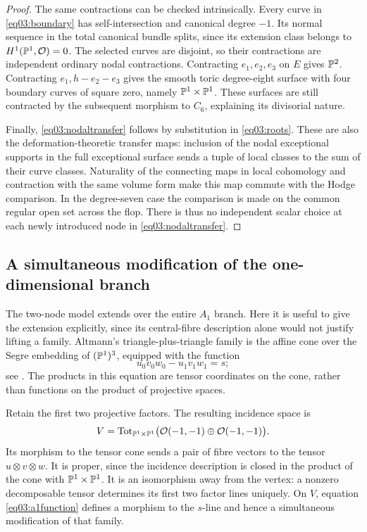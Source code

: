 \begin{proof}
The same contractions can be checked intrinsically.  Every curve
in \eqref{eq03:boundary} has self-intersection and canonical degree
$-1$.  Its normal sequence in the total canonical bundle splits,
since its extension class belongs to $H^1(\mathbb{P}^1,\mathcal{O})=0$.
The selected curves are disjoint, so their contractions are independent
ordinary nodal contractions.  Contracting $e_1,e_2,e_3$ on $E$ gives
$\mathbb{P}^2$.  Contracting $e_1,h-e_2-e_3$ gives the smooth toric
degree-eight surface with four boundary curves of square zero,
namely $\mathbb{P}^1\times\mathbb{P}^1$.  These surfaces are still contracted
by the subsequent morphism to $C_6$, explaining its divisorial nature.

Finally, \eqref{eq03:nodaltransfer} follows by substitution in
\eqref{eq03:roots}.  These are also the deformation-theoretic transfer
maps: inclusion of the nodal exceptional supports in the full
exceptional surface sends a tuple of local classes to the sum of
their curve classes.  Naturality of the connecting maps in local
cohomology and contraction with the same volume form make this map
commute with the Hodge comparison.  In the degree-seven case the
comparison is made on the common regular open set across the flop.
There is thus no independent scalar choice at each newly introduced
node in \eqref{eq03:nodaltransfer}.
\end{proof}

\subsection{A simultaneous modification of the one-dimensional branch}

The two-node model extends over the entire $A_1$ branch.  Here it is
useful to give the extension explicitly, since its central-fibre
description alone would not justify lifting a family.
Altmann's triangle-plus-triangle family is the affine cone over the
Segre embedding of $(\mathbb{P}^1)^3$, equipped with the function
\begin{equation}\label{eq03:a1function}
 u_0v_0w_0-u_1v_1w_1=s;
\end{equation}
see \cite[Section~8.2(i)]{Altmann97}.  The products in this equation
are tensor coordinates on the cone, rather than functions on the
product of projective spaces.

Retain the first two projective factors.  The resulting incidence
space is
\[
 V=\operatorname{Tot}_{\mathbb{P}^1\times\mathbb{P}^1}
       \bigl(\mathcal{O}(-1,-1)\oplus\mathcal{O}(-1,-1)\bigr).
\]
Its morphism to the tensor cone sends a pair of fibre vectors to the
tensor $u\otimes v\otimes w$.  It is proper, since the incidence
description is closed in the product of the cone with
$\mathbb{P}^1\times\mathbb{P}^1$.  It is an isomorphism away from the vertex:
a nonzero decomposable tensor determines its first two factor lines
uniquely.  On $V$, equation \eqref{eq03:a1function} defines a morphism
to the $s$-line and hence a simultaneous modification of that family.

